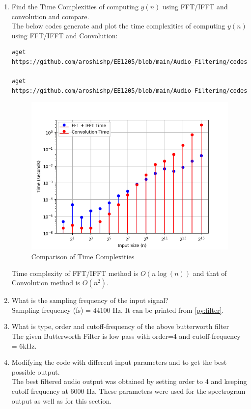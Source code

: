 \documentclass[journal,12pt,twocolumn]{IEEEtran}
\theoremstyle{remark}
\renewcommand\thesection{\arabic{section}}
\numberwithin{equation}{subsection}
\begin{document}
\begin{enumerate}[label=\thesection.\arabic*]
\item Find the Time Complexities of computing $y(n)$ using FFT/IFFT and convolution and compare. 
\\
\solution The below codes generate and plot the time complexities of computing $y(n)$ using FFT/IFFT and Convolution:
\begin{lstlisting}
wget https://github.com/aroshishp/EE1205/blob/main/Audio_Filtering/codes/7.4.c

wget https://github.com/aroshishp/EE1205/blob/main/Audio_Filtering/codes/7.4.py
\end{lstlisting}
\begin{figure}[!h]
    \centering
    \includegraphics[width = \columnwidth]{figs/7.4.png}
    \caption{Comparison of Time Complexities}
    \label{fig:7.4}
\end{figure}
Time complexity of FFT/IFFT method is $O(n\log(n))$ and that of Convolution method is $O(n^2)$.
\\
\item What is the sampling frequency of the input signal?
\\
\solution
Sampling frequency (fs) = $44100$ Hz. It can be printed from \ref{py:filter}.
\\
\item
What is type, order and  cutoff-frequency of the above butterworth filter
\\
\solution
The given Butterworth Filter is low pass with order=4 and cutoff-frequency = 6kHz.
\\
\item
Modifying the code with different input parameters and to get the best possible output.
\\
\solution The best filtered audio output was obtained by setting order to 4 and keeping cutoff frequency at 6000 Hz. These parameters were used for the spectrogram output as well as for this section.
\end{enumerate}
\end{document}
